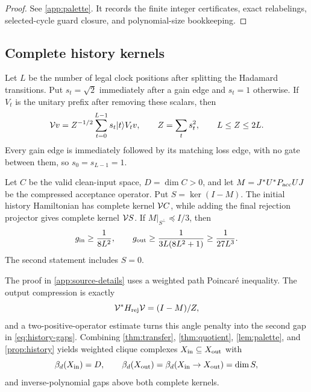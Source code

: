 \begin{proof}
See \cref{app:palette}.  It records the finite integer certificates, exact
relabelings, selected-cycle guard closure, and polynomial-size bookkeeping.
\end{proof}

\subsection{Complete history kernels}

Let \(L\) be the number of legal clock positions after splitting the
Hadamard transitions.  Put \(s_t=\sqrt2\) immediately after a gain edge and
\(s_t=1\) otherwise.  If \(V_t\) is the unitary prefix after removing these
scalars, then
\begin{equation}
\label{eq:history-isometry}
\mathcal{V} v=Z^{-1/2}\sum_{t=0}^{L-1}s_t\lvert t\rangle V_tv,\qquad
Z=\sum_ts_t^2,\qquad L\le Z\le2L.
\end{equation}
Every gain edge is immediately followed by its matching loss edge, with no
gate between them, so \(s_0=s_{L-1}=1\).

\begin{proposition}
\label{prop:history}
Let \(C\) be the valid clean-input space, \(D=\dim C>0\), and let
\(M=J^*U^*P_{\rm acc}UJ\) be the compressed acceptance operator.  Put
\(S=\ker(I-M)\).  The initial history Hamiltonian has complete kernel
\(\mathcal{V} C\), while adding the final rejection projector gives complete kernel
\(\mathcal{V} S\).  If \(M|_{S^\perp}\preceq I/3\), then
\begin{equation}
\label{eq:history-gaps}
g_{\rm in}\ge\frac1{8L^2},\qquad
g_{\rm out}\ge\frac1{3L(8L^2+1)}\ge\frac1{27L^3}.
\end{equation}
The second statement includes \(S=0\).
\end{proposition}

The proof in \cref{app:source-details} uses a weighted path Poincar\'e
inequality.  The output compression is exactly
\begin{equation}
\label{eq:output-compression}
\mathcal{V}^*H_{\rm rej}\mathcal{V}=(I-M)/Z,
\end{equation}
and a two-positive-operator estimate turns this angle penalty into the second
gap in \cref{eq:history-gaps}.  Combining
\cref{thm:transfer}, \cref{thm:quotient}, \cref{lem:palette}, and
\cref{prop:history} yields weighted
clique complexes \(X_{\mathrm{in}}\subseteq X_{\mathrm{out}}\) with
\begin{equation}
\label{eq:generic-circuit-transfer}
\beta_d(X_{\mathrm{in}})=D,\qquad
\beta_d(X_{\mathrm{out}})=\beta_d(X_{\mathrm{in}}\to X_{\mathrm{out}})=\dim S,
\end{equation}
and inverse-polynomial gaps above both complete kernels.

